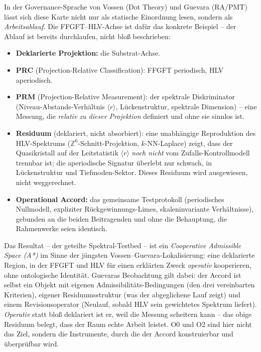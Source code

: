 In der Governance-Sprache von Vossen (Dot Theory) und Guevara (RA/PMT) lässt sich diese Karte
nicht nur als statische Einordnung lesen, sondern als \emph{Arbeitsablauf}. Die FFGFT--HLV-Achse
ist dafür das konkrete Beispiel -- der Ablauf ist bereits durchlaufen, nicht bloß beschrieben:

\begin{itemize}
  \item \textbf{Deklarierte Projektion:} die Substrat-Achse.
  \item \textbf{PRC} (Projection-Relative Classification): FFGFT periodisch, HLV aperiodisch.
  \item \textbf{PRM} (Projection-Relative Measurement): der spektrale Diskriminator
        (Niveau-Abstands-Verhältnis $\langle r\rangle$, Lückenstruktur, spektrale Dimension)
        -- eine Messung, die \emph{relativ zu dieser Projektion} definiert und ohne sie sinnlos ist.
  \item \textbf{Residuum} (deklariert, nicht absorbiert): eine unabhängige Reproduktion des
        HLV-Spektrums ($\mathbb{Z}^6$-Schnitt-Projektion, $k$-NN-Laplace) zeigt, dass der
        Quasikristall auf der Leitstatistik $\langle r\rangle$ \emph{noch nicht} vom
        Zufalls-Kontrollmodell trennbar ist; die aperiodische Signatur überlebt nur schwach,
        in Lückenstruktur und Tiefmoden-Sektor. Dieses Residuum wird ausgewiesen, nicht weggerechnet.
  \item \textbf{Operational Accord:} das gemeinsame Testprotokoll (periodisches Nullmodell,
        expliziter Rückgewinnungs-Limes, skaleninvariante Verhältnisse), gebunden an die beiden
        Beitragenden und ohne die Behauptung, die Rahmenwerke seien identisch.
\end{itemize}

\noindent Das Resultat -- der geteilte Spektral-Testbed -- ist ein \emph{Cooperative Admissible
Space (A*)} im Sinne der jüngsten Vossen--Guevara-Lokalisierung: eine deklarierte Region, in der
FFGFT und HLV für einen erklärten Zweck \emph{operativ} kooperieren, ohne ontologische Identität.
Guevaras Beobachtung gilt dabei: der Accord ist selbst ein Objekt mit eigenen
Admissibilitäts-Bedingungen (den drei vereinbarten Kriterien), eigener Residuumsstruktur (was der
abgeglichene Lauf zeigt) und einem Revisionsoperator (Neulauf, sobald HLV sein gewichtetes Spektrum
liefert). \emph{Operativ} statt bloß deklariert ist er, weil die Messung scheitern kann -- das
obige Residuum belegt, dass der Raum echte Arbeit leistet. O0 und O2 sind hier nicht das Ziel,
sondern die Instrumente, durch die der Accord konstruierbar und überprüfbar wird.

